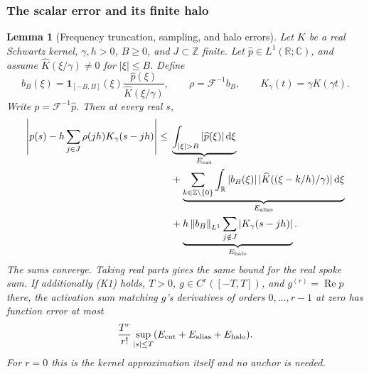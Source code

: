 \documentclass[11pt,letterpaper]{article}
\newcommand{\R}{\mathbb R}
\newcommand{\C}{\mathbb C}
\newcommand{\Z}{\mathbb Z}
\newcommand{\dd}{\,\mathrm d}
\newcommand{\norm}[1]{\left\lVert#1\right\rVert}
\newtheorem{lemma}{Lemma}[section]
\theoremstyle{definition}
\theoremstyle{remark}
\begin{document}
\subsubsection{The scalar error and its finite halo}
\begin{lemma}[Frequency truncation, sampling, and halo errors]\label{thm:ledger}
Let \(K\) be a real Schwartz kernel, \(\gamma,h>0\), \(B\ge0\), and \(J\subset\Z\)
finite. Let \(\widehat p\in L^1(\R;\C)\), and assume
\(\widehat K(\xi/\gamma)\ne0\) for \(|\xi|\le B\). Define
\[
 b_B(\xi)=\mathbf1_{[-B,B]}(\xi)
             \frac{\widehat p(\xi)}{\widehat K(\xi/\gamma)},\qquad
 \rho=\mathcal F^{-1}b_B,\qquad K_\gamma(t)=\gamma K(\gamma t).
\]
Write \(p=\mathcal F^{-1}\widehat p\). Then at every real \(s\),
\begin{align}
 \left|p(s)-h\sum_{j\in J}\rho(jh)K_\gamma(s-jh)\right|
 \le{}&
 \underbrace{\int_{|\xi|>B}|\widehat p(\xi)|\dd\xi}_{E_{\rm cut}}\nonumber\\
 &+\underbrace{\sum_{k\in\Z\setminus\{0\}}\int_\R
       |b_B(\xi)|\,|\widehat K((\xi-k/h)/\gamma)|\dd\xi}_{E_{\rm alias}}\label{eq:ledger}\\
 &+\underbrace{h\norm{b_B}_{L^1}
       \sum_{j\notin J}|K_\gamma(s-jh)|}_{E_{\rm halo}}.\nonumber
\end{align}
The sums converge. Taking real parts gives the same bound for the real spoke sum.
If additionally (K1) holds, \(T>0\), \(g\in C^r([-T,T])\), and \(g^{(r)}=\operatorname{Re}p\)
there, the activation sum matching \(g\)'s derivatives of orders
\(0,\ldots,r-1\) at zero
has function error at most
\[
 \frac{T^r}{r!}\sup_{|s|\le T}
       (E_{\rm cut}+E_{\rm alias}+E_{\rm halo}).
\]
For \(r=0\) this is the kernel approximation itself and no anchor is needed.
\end{lemma}
\end{document}

